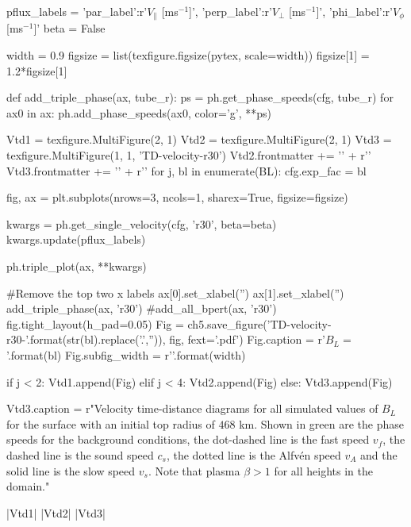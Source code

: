 \begin{pycode}[chapter5]
pflux_labels = {'par_label':r'$V_\parallel$ [ms$^{-1}$]', 
                'perp_label':r'$V_\perp$ [ms$^{-1}$]',
                'phi_label':r'$V_\phi$ [ms$^{-1}$]'}
beta = False

width = 0.9
figsize = list(texfigure.figsize(pytex, scale=width))
figsize[1] = 1.2*figsize[1]

def add_triple_phase(ax, tube_r):
    ps = ph.get_phase_speeds(cfg, tube_r)
    for ax0 in ax:
        ph.add_phase_speeds(ax0, color='g', **ps)
    
Vtd1 = texfigure.MultiFigure(2, 1)
Vtd2 = texfigure.MultiFigure(2, 1)
Vtd3 = texfigure.MultiFigure(1, 1, 'TD-velocity-r30')
Vtd2.frontmatter += '\n' + r'\ContinuedFloat'
Vtd3.frontmatter += '\n' + r'\ContinuedFloat'
for j, bl in enumerate(BL):
    cfg.exp_fac = bl
    
    fig, ax = plt.subplots(nrows=3, ncols=1, sharex=True, figsize=figsize)
    
    kwargs = ph.get_single_velocity(cfg, 'r30', beta=beta)
    kwargs.update(pflux_labels)
    
    ph.triple_plot(ax, **kwargs)
    
    #Remove the top two x labels
    ax[0].set_xlabel('')
    ax[1].set_xlabel('')
    add_triple_phase(ax, 'r30')
    #add_all_bpert(ax, 'r30')
    fig.tight_layout(h_pad=0.05)
    Fig = ch5.save_figure('TD-velocity-r30-{}'.format(str(bl).replace('.','')), fig, fext='.pdf')
    Fig.caption = r'$B_L = {}$'.format(bl)
    Fig.subfig_width = r'{}\columnwidth'.format(width)

    if j < 2:
        Vtd1.append(Fig)
    elif j < 4:
        Vtd2.append(Fig)
    else:
        Vtd3.append(Fig)

Vtd3.caption = r"Velocity time-distance diagrams for all simulated values of $B_L$ for the surface with an initial top radius of $468$ km. Shown in green are the phase speeds for the background conditions, the dot-dashed line is the fast speed $v_f$, the dashed line is the sound speed $c_s$, the dotted line is the Alfv\'en speed $v_A$ and the solid line is the slow speed $v_s$. Note that plasma $\beta > 1$ for all heights in the domain."

\end{pycode}

\py[chapter5]|Vtd1|
\py[chapter5]|Vtd2|
\py[chapter5]|Vtd3|

